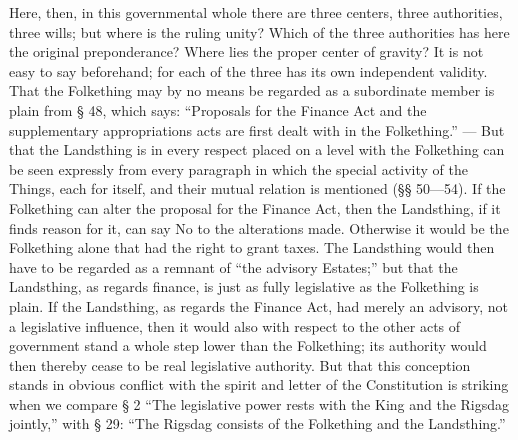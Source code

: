 \documentclass[12pt,a4paper,openany]{book}
\newcommand{\opage}[1]{\marginnote{\footnotesize\textit{[#1]}}}
\begin{document}
Here, then, in this governmental whole there are three centers,
three authorities, three wills; but where is the ruling
unity? Which of the three authorities has
here the original preponderance? Where lies the proper
center of gravity? It is not easy to
say beforehand; for each of the three has its own independent validity.
That the Folkething may by no means be regarded as a subordinate
member is plain from § 48, which says:
``Proposals for the Finance Act and the supplementary appropriations acts
are first dealt with in the Folkething.'' --- But that the Landsthing is in every respect placed on a level with the Folkething
can be seen expressly from every paragraph in which
the special activity of the Things, each for itself, and their
mutual relation is mentioned (§§ 50---54). If the Folkething can
alter the proposal for the Finance Act, then
the Landsthing, if it finds reason for it, can say No
to the alterations made. Otherwise it would
be the Folkething alone that had the right to grant taxes.
The Landsthing would then have to be regarded as
a remnant of ``the advisory Estates;'' but that
the Landsthing, as regards finance, is just as
fully legislative as the Folkething is plain.
If the Landsthing, as regards the Finance Act, had merely
an advisory, not a legislative influence,
then it would also with respect to the other acts of government
stand a whole step lower than
the Folkething; its authority would then thereby cease
to be real legislative authority. But that this
conception stands in obvious conflict with the spirit
and letter of the Constitution is striking when we
\setcounter{footnote}{0}%
\opage{9}compare § 2 ``The legislative power rests with the King and
the Rigsdag jointly,'' with § 29: ``The Rigsdag consists
of the Folkething and the Landsthing.''
\end{document}
